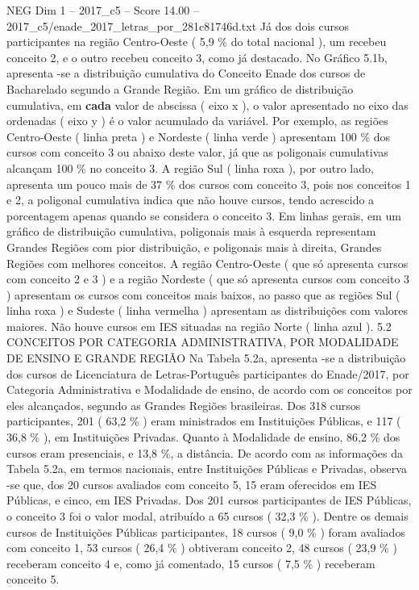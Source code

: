 \begin{textsample}{NEG Dim 1 – 2017\_c5 – Score 14.00 – 2017\_c5/enade\_2017\_letras\_por\_281c81746d.txt}
Já dos dois cursos participantes na região Centro-Oeste ( 5,9 \% do total nacional ), um recebeu conceito 2, e o outro recebeu conceito 3, como já destacado.
No Gráfico 5.1b, apresenta -se a distribuição cumulativa do Conceito Enade dos cursos de Bacharelado segundo a Grande Região.
Em um gráfico de distribuição cumulativa, em \textbf{cada} valor de abscissa ( eixo x ), o valor apresentado no eixo das ordenadas ( eixo y ) é o valor acumulado da variável.
Por exemplo, as regiões Centro-Oeste ( linha preta ) e Nordeste ( linha verde ) apresentam 100 \% dos cursos com conceito 3 ou abaixo deste valor, já que as poligonais cumulativas alcançam 100 \% no conceito 3.
A região Sul ( linha roxa ), por outro lado, apresenta um pouco mais de 37 \% dos cursos com conceito 3, pois nos conceitos 1 e 2, a poligonal cumulativa indica que não houve cursos, tendo acrescido a porcentagem apenas quando se considera o conceito 3.
Em linhas gerais, em um gráfico de distribuição cumulativa, poligonais mais à esquerda representam Grandes Regiões com pior distribuição, e poligonais mais à direita, Grandes Regiões com melhores conceitos.
A região Centro-Oeste ( que só apresenta cursos com conceito 2 e 3 ) e a região Nordeste ( que só apresenta cursos com conceito 3 ) apresentam os cursos com conceitos mais baixos, ao passo que as regiões Sul ( linha roxa ) e Sudeste ( linha vermelha ) apresentam as distribuições com valores maiores.
Não houve cursos em IES situadas na região Norte ( linha azul ). 5.2 CONCEITOS POR CATEGORIA ADMINISTRATIVA, POR MODALIDADE DE ENSINO E GRANDE REGIÃO Na Tabela 5.2a, apresenta -se a distribuição dos cursos de Licenciatura de Letras-Português participantes do Enade/2017, por Categoria Administrativa e Modalidade de ensino, de acordo com os conceitos por eles alcançados, segundo as Grandes Regiões brasileiras.
Dos 318 cursos participantes, 201 ( 63,2 \% ) eram ministrados em Instituições Públicas, e 117 ( 36,8 \% ), em Instituições Privadas.
Quanto à Modalidade de ensino, 86,2 \% dos cursos eram presenciais, e 13,8 \%, a distância.
De acordo com as informações da Tabela 5.2a, em termos nacionais, entre Instituições Públicas e Privadas, observa -se que, dos 20 cursos avaliados com conceito 5, 15 eram oferecidos em IES Públicas, e cinco, em IES Privadas.
Dos 201 cursos participantes de IES Públicas, o conceito 3 foi o valor modal, atribuído a 65 cursos ( 32,3 \% ).
Dentre os demais cursos de Instituições Públicas participantes, 18 cursos ( 9,0 \% ) foram avaliados com conceito 1, 53 cursos ( 26,4 \% ) obtiveram conceito 2, 48 cursos ( 23,9 \% ) receberam conceito 4 e, como já comentado, 15 cursos ( 7,5 \% ) receberam conceito 5.

\end{textsample}
